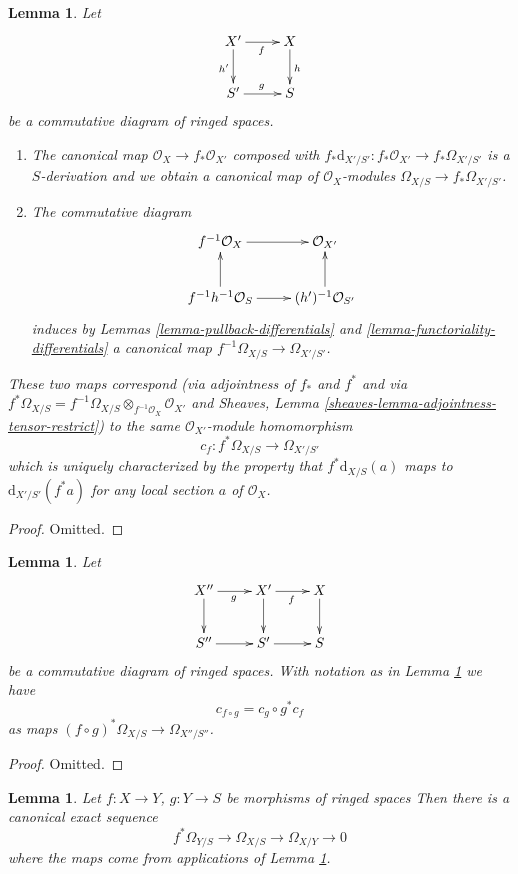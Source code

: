 \documentclass{stacks-project}
\theoremstyle{plain}
\newtheorem{lemma}[subsection]{Lemma}
\theoremstyle{definition}
\theoremstyle{remark}
\numberwithin{equation}{subsection}
\begin{document}
\begin{lemma}
\label{lemma-functoriality-differentials-ringed-spaces}
Let
$$
\xymatrix{
X' \ar[d]_{h'} \ar[r]_f & X \ar[d]^h \\
S' \ar[r]^g & S
}
$$
be a commutative diagram of ringed spaces.
\begin{enumerate}
\item The canonical map $\mathcal{O}_X \to f_*\mathcal{O}_{X'}$ composed with
$f_*\text{d}_{X'/S'} : f_*\mathcal{O}_{X'} \to f_*\Omega_{X'/S'}$ is a
$S$-derivation and we obtain a canonical map of $\mathcal{O}_X$-modules
$\Omega_{X/S} \to f_*\Omega_{X'/S'}$.
\item The commutative diagram
$$
\xymatrix{
f^{-1}\mathcal{O}_X \ar[r] & \mathcal{O}_{X'} \\
f^{-1}h^{-1}\mathcal{O}_S \ar[u] \ar[r] & (h')^{-1}\mathcal{O}_{S'} \ar[u]
}
$$
induces by Lemmas \ref{lemma-pullback-differentials} and
\ref{lemma-functoriality-differentials}
a canonical map $f^{-1}\Omega_{X/S} \to \Omega_{X'/S'}$.
\end{enumerate}
These two maps correspond (via adjointness of $f_*$ and $f^*$ and
via $f^*\Omega_{X/S} =
f^{-1}\Omega_{X/S} \otimes_{f^{-1}\mathcal{O}_X} \mathcal{O}_{X'}$ and
Sheaves, Lemma \ref{sheaves-lemma-adjointness-tensor-restrict})
to the same $\mathcal{O}_{X'}$-module homomorphism
$$
c_f : f^*\Omega_{X/S} \longrightarrow \Omega_{X'/S'}
$$
which is uniquely characterized by the property that
$f^*\text{d}_{X/S}(a)$ maps to $\text{d}_{X'/S'}(f^*a)$
for any local section $a$ of $\mathcal{O}_X$.
\end{lemma}

\begin{proof}
Omitted.
\end{proof}

\begin{lemma}
\label{lemma-check-functoriality-differentials}
Let
$$
\xymatrix{
X'' \ar[d] \ar[r]_g & X' \ar[d] \ar[r]_f & X \ar[d] \\
S'' \ar[r] & S' \ar[r] & S
}
$$
be a commutative diagram of ringed spaces. With notation as in
Lemma \ref{lemma-functoriality-differentials-ringed-spaces} we have
$$
c_{f \circ g} = c_g \circ g^* c_f
$$
as maps $(f \circ g)^*\Omega_{X/S} \to \Omega_{X''/S''}$.
\end{lemma}

\begin{proof}
Omitted.
\end{proof}

\begin{lemma}
\label{lemma-triangle-differentials}
Let $f : X \to Y$, $g : Y \to S$ be morphisms of ringed spaces
Then there is a canonical exact sequence
$$
f^*\Omega_{Y/S} \to \Omega_{X/S} \to \Omega_{X/Y} \to 0
$$
where the maps come from applications of
Lemma \ref{lemma-functoriality-differentials-ringed-spaces}.
\end{lemma}
\end{document}
